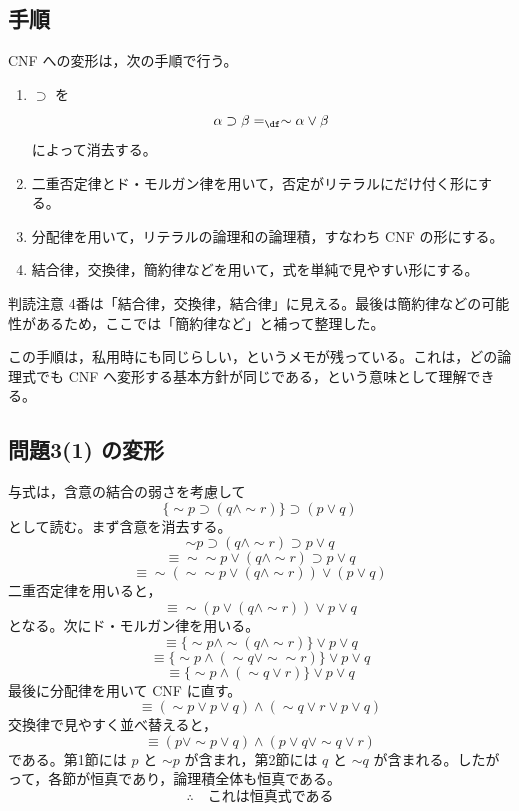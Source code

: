\documentclass[../main.tex]{subfiles}
\begin{document}
\subsection{手順}

CNF への変形は，次の手順で行う。

\begin{enumerate}[label=(\arabic*)]
  \item \(\supset\) を
  \[
    \alpha \supset \beta
    =_{\df}
    \sim \alpha \lor \beta
  \]
  によって消去する。

  \item 二重否定律とド・モルガン律を用いて，否定がリテラルにだけ付く形にする。

  \item 分配律を用いて，リテラルの論理和の論理積，すなわち CNF の形にする。

  \item 結合律，交換律，簡約律などを用いて，式を単純で見やすい形にする。
\end{enumerate}

\begin{sidebox}[TBred]{判読注意}
  4番は「結合律，交換律，結合律」に見える。最後は簡約律などの可能性があるため，ここでは「簡約律など」と補って整理した。
\end{sidebox}

この手順は，私用時にも同じらしい，というメモが残っている。これは，どの論理式でも CNF へ変形する基本方針が同じである，という意味として理解できる。

\subsection{問題3(1) の変形}

与式は，含意の結合の弱さを考慮して
\[
  \{\sim p \supset (q \land \sim r)\} \supset (p \lor q)
\]
として読む。まず含意を消去する。
\[
  \sim p \supset (q \land \sim r) \supset p \lor q
\]
\[
  \equiv
  \sim\sim p \lor (q \land \sim r) \supset p \lor q
\]
\[
  \equiv
  \sim(\sim\sim p \lor (q \land \sim r)) \lor (p \lor q)
\]
二重否定律を用いると，
\[
  \equiv
  \sim(p \lor (q \land \sim r)) \lor p \lor q
\]
となる。次にド・モルガン律を用いる。
\[
  \equiv
  \{\sim p \land \sim(q \land \sim r)\} \lor p \lor q
\]
\[
  \equiv
  \{\sim p \land (\sim q \lor \sim\sim r)\} \lor p \lor q
\]
\[
  \equiv
  \{\sim p \land (\sim q \lor r)\} \lor p \lor q
\]
最後に分配律を用いて CNF に直す。
\[
  \equiv
  (\sim p \lor p \lor q)
  \land
  (\sim q \lor r \lor p \lor q)
\]
交換律で見やすく並べ替えると，
\[
  \equiv
  (p \lor \sim p \lor q)
  \land
  (p \lor q \lor \sim q \lor r)
\]
である。第1節には \(p\) と \(\sim p\) が含まれ，第2節には \(q\) と \(\sim q\) が含まれる。したがって，各節が恒真であり，論理積全体も恒真である。
\[
  \therefore
  \quad
  \text{これは恒真式である}
\]
\end{document}
